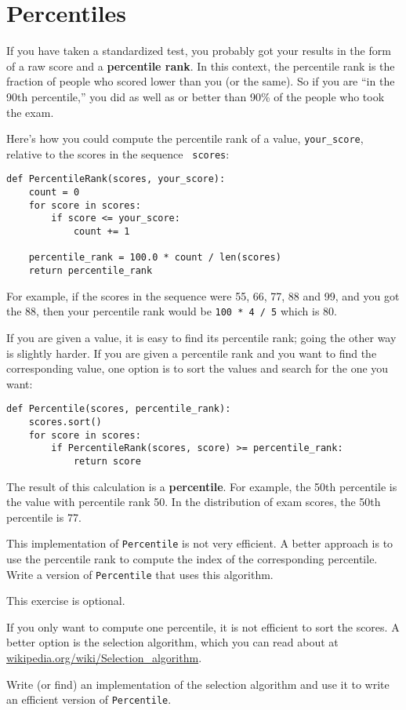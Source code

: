 \documentclass[10pt]{book}
\begin{document}
\section{Percentiles}

If you have taken a standardized test, you probably got your
results in the form of a raw score and a {\bf percentile rank}.
In this context, the percentile rank is the fraction of people who
scored lower than you (or the same).  So if you are ``in the 90th
percentile,'' you did as well as or better than 90\% of the people who
took the exam.

Here's how you could compute the percentile rank of a value,
\verb"your_score", relative to the scores in the sequence {\tt
  scores}:

\begin{verbatim}
def PercentileRank(scores, your_score):
    count = 0
    for score in scores:
        if score <= your_score:
            count += 1

    percentile_rank = 100.0 * count / len(scores)
    return percentile_rank
\end{verbatim}
%
%
For example, if the scores in the sequence were 55, 66, 77, 88 and 99,
and you got the 88, then your percentile rank would be {\tt 100 * 4 / 5}
which is 80.

If you are given a value, it is easy to find its percentile rank; going
the other way is slightly harder.  If you are given a percentile rank
and you want to find the corresponding value, one option is to
sort the values and search for the one you want:

\begin{verbatim}
def Percentile(scores, percentile_rank):
    scores.sort()
    for score in scores:
        if PercentileRank(scores, score) >= percentile_rank:
            return score
\end{verbatim}

The result of this calculation is a {\bf percentile}.  For example,
the 50th percentile is the value with percentile rank 50.  In the
distribution of exam scores, the 50th percentile is 77.

\begin{ex}
This implementation of {\tt Percentile} is not very efficient.  A
better approach is to use the percentile rank to compute the index of
the corresponding percentile.  Write a version of {\tt Percentile} that
uses this algorithm.
\end{ex}

\begin{ex}
This exercise is optional.

If you only want to compute one percentile, it is not efficient
to sort the scores.  A better option is the selection algorithm,
which you can read about at \url{wikipedia.org/wiki/Selection_algorithm}.

Write (or find) an implementation of the selection algorithm and use
it to write an efficient version of {\tt Percentile}.
\end{ex}
\end{document}
